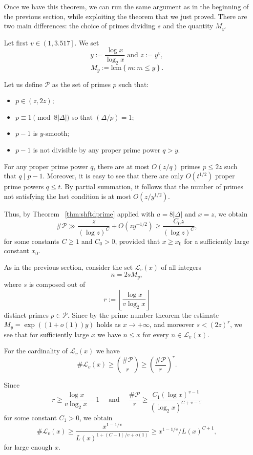 \documentclass[12pt,a4paper,oneside]{amsart}
\begin{document}
Once we have this theorem, we can run the same argument as in the beginning of the previous section, while exploiting the theorem that we just proved. There are two main differences: the choice of primes dividing $s$ and the quantity $M_y$.

Let first $v\in \left(1, 3.517\right]$. We set 
\[ y := \frac{\log x}{\log_{2} x} \text{ and } z := y^v,\]
\[M_y:= \mathrm{lcm}\left\{m: m\le y\right\}.\]

Let us define $\mathcal{P}$ as the set of primes  $p$ such that:
\begin{itemize}
\item  $p \in \left(z, 2z\right)$;
\item  $p\equiv 1\pmod{8|\Delta|}$ so that $(\Delta/p)=1$;
\item  $p-1$ is $y$-smooth;
\item  $p-1$ is not divisible by any 
proper prime power $q > y$. 
\end{itemize}

For any proper prime power $q$, there are at most $O(z/q)$ primes $p \le 2z$ such that $q\mid p-1$. Moreover, it is easy to see that there are only  $O(
t^{1/2})$ proper prime powers $q\le t$. By partial summation, 
it follows that the number of primes not satisfying the last condition is at most $O(z/y^{1/2})$.

Thus, by Theorem~ \ref{thm:shftdprime} applied with $a=8|\Delta|$ and $x=z$, we obtain
$$
\#\mathcal{P} \gg \frac{z}{(\log z)^{C}} + O(zy^{-1/2}) \ge  \frac{C_0z}{(\log z)^{C}},
$$
for some constants $C \ge 1$ and $C_0>0$, provided that $x\ge x_0$ for a sufficiently large constant $x_0$. 

As in the previous section, consider the set $\mathcal{L}_v(x)$ of all integers \[n = 2sM_y,\]
where  $s$ is composed out of 
$$
r :=\left\lfloor{\frac{\log x}{v\log_{2} x}}\right\rfloor
$$ 
distinct primes $p\in \mathcal{P}$. 
Since by the prime number theorem the estimate 
$M_y =\exp((1+o(1)) y)$ holds as $x\to+\infty$, and moreover $ s < (2z)^r$,
we see that for sufficiently large $x$ we have $n \le x$ for 
every $n \in \mathcal{L}_v(x)$. 

For the cardinality of $\mathcal{L}_v(x)$ we have
$$\# \mathcal{L}_v(x) \ge \binom{\#\mathcal{P}}{r} \ge  \left(\frac{\#\mathcal{P}}{r}\right)^r . $$

Since 
\[
r \ge \frac{\log x}{v\log_{2} x}-1
\quad\text{ and }\quad
\frac{\#\mathcal{P}}{r} \ge \frac{C_1(\log x)^{v-1}}{(\log_{2} x)^{C+v-1}}
\]
for some constant $C_1>0$, we obtain \[\# \mathcal{L}_v(x) \ge \frac{x^{1-1/v}}{L(x)^{1+(C-1)/v+o(1)}}\ge x^{1-1/v}/L(x)^{C+1},\] for large enough $x$. 
\end{document}
